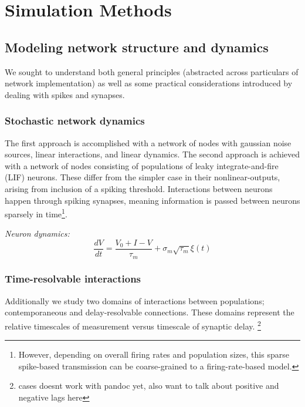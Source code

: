 \hypertarget{simulation-methods}{%
\section{Simulation Methods}\label{simulation-methods}}

\hypertarget{modeling-network-structure-and-dynamics}{%
\subsection{Modeling network structure and
dynamics}\label{modeling-network-structure-and-dynamics}}

We sought to understand both general principles (abstracted across
particulars of network implementation) as well as some practical
considerations introduced by dealing with spikes and synapses.

\hypertarget{stochastic-network-dynamics}{%
\subsubsection{Stochastic network
dynamics}\label{stochastic-network-dynamics}}

The first approach is accomplished with a network of nodes with gaussian
noise sources, linear interactions, and linear dynamics. The second
approach is achieved with a network of nodes consisting of populations
of leaky integrate-and-fire (LIF) neurons. These differ from the simpler
case in their nonlinear-outputs, arising from inclusion of a spiking
threshold. Interactions between neurons happen through spiking synapses,
meaning information is passed between neurons sparsely in
time\footnote{However, depending on overall firing rates and population
  sizes, this sparse spike-based transmission can be coarse-grained to a
  firing-rate-based model.}.

\emph{Neuron dynamics:} \[
\frac{dV}{dt} = \frac{V_0 + I - V}{\tau_m} + \sigma_m \sqrt{\tau_m} \xi(t)
\]

\hypertarget{time-resolvable-interactions}{%
\subsubsection{Time-resolvable
interactions}\label{time-resolvable-interactions}}

Additionally we study two domains of interactions between populations;
contemporaneous and delay-resolvable connections. These domains
represent the relative timescales of measurement versus timescale of
synaptic delay. \footnote{cases doesnt work with pandoc yet, also want
  to talk about positive and negative lags here}

